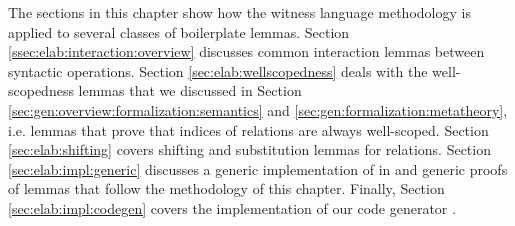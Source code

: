 The sections in this chapter show how the witness language methodology is
applied to several classes of boilerplate lemmas. Section
\ref{ssec:elab:interaction:overview} discusses common interaction lemmas between
syntactic operations. Section \ref{sec:elab:wellscopedness} deals with the
well-scopedness lemmas that we discussed in Section
\ref{sec:gen:overview:formalization:semantics} and
\ref{sec:gen:formalization:metatheory}, i.e. lemmas that prove that indices of
relations are always well-scoped. Section \ref{sec:elab:shifting} covers
shifting and substitution lemmas for relations. Section
\ref{sec:elab:impl:generic} discusses a generic implementation of \Knot in \Coq
and generic proofs of lemmas that follow the methodology of this chapter.
Finally, Section \ref{sec:elab:impl:codegen} covers the implementation of our
code generator \Needle.






 \clearpage





